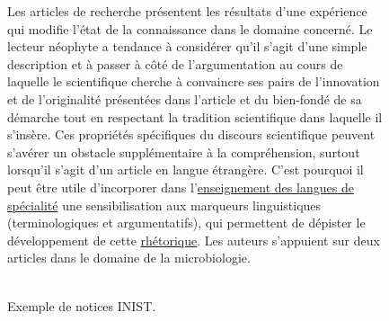 \begin{figure}[t]
{{          Les articles de recherche présentent les résultats d'une expérience
          qui modifie l'état de la connaissance dans le domaine concerné. Le
          lecteur néophyte a tendance à considérer qu'il s'agit d'une simple
          description et à passer à côté de l'argumentation au cours de laquelle
          le scientifique cherche à convaincre ses pairs de l'innovation et de
          l'originalité présentées dans l'article et du bien-fondé de sa
          démarche tout en respectant la tradition scientifique dans laquelle il
          s'insère. Ces propriétés spécifiques du discours scientifique peuvent
          s'avérer un obstacle supplémentaire à la compréhension, surtout
          lorsqu'il s'agit d'un article en langue étrangère. C'est pourquoi il
          peut être utile d'incorporer dans l'\underline{enseignement des }
          \underline{\underline{langues} de spécialité} une sensibilisation aux
          marqueurs linguistiques (terminologiques et argumentatifs), qui
          permettent de dépister le développement de cette
          \underline{rhétorique}. Les auteurs s'appuient sur deux articles dans
          le domaine de la microbiologie.
        }
      }
    ~\\~\\
    \caption{Exemple de notices INIST.
             \label{fig:exemple_notice_inist}}
  \end{figure}
  \addtocounter{footnote}{-2}
  \addtocounter{footnote}{1}
  \addtocounter{footnote}{1}

